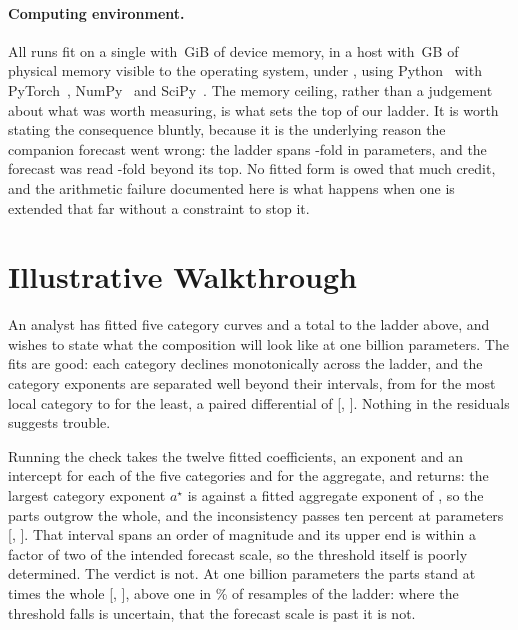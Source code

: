 \documentclass[11pt]{article}
\begin{document}
\paragraph{Computing environment.}
All runs fit on a single  with \,GiB of device
memory, in a host with \,GB of physical memory visible to the
operating system, under , using Python~ with
PyTorch~, NumPy~ and SciPy~. The
memory ceiling, rather than a judgement about what was worth measuring, is what sets
the top of our ladder. It is worth stating the consequence bluntly, because it is
the underlying reason the companion forecast went wrong: the ladder spans
-fold in parameters, and the forecast was read
-fold beyond its top. No fitted form is owed that much
credit, and the arithmetic failure documented here is what happens when one is
extended that far without a constraint to stop it.

\section{Illustrative Walkthrough}
\label{sec:walk}

An analyst has fitted five category curves and a total to the ladder above, and
wishes to state what the composition will look like at one billion parameters. The
fits are good: each category declines monotonically across the ladder, and the
category exponents are separated well beyond their intervals, from
 for the most local category to  for the
least, a paired differential of 
[, ]. Nothing in the residuals
suggests trouble.

Running the check takes the twelve fitted coefficients, an exponent and an
intercept for each of the five categories and for the aggregate, and returns: the largest category exponent $a^\star$ is
 against a fitted aggregate exponent of , so the
parts outgrow the whole, and the inconsistency passes ten percent at
 parameters [, ].
That interval spans an order of magnitude and its upper end is within a factor of two
of the intended forecast scale, so the threshold itself is poorly determined. The
verdict is not. At one billion parameters the parts stand at  times
the whole [, ], above one in
\% of resamples of the ladder: where the threshold falls is
uncertain, that the forecast scale is past it is not.
\end{document}
